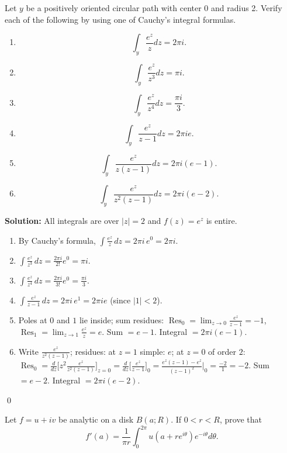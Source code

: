 \begin{problembox}
Let \( y \) be a positively oriented circular path with center 0 and radius 2. Verify each of the following by using one of Cauchy's integral formulas.
\begin{enumerate}[label=(\alph*)]
\item \[ \int_y \frac{e^z}{z} dz = 2\pi i. \]
\item \[ \int_y \frac{e^z}{z^3} dz = \pi i. \]
\item \[ \int_y \frac{e^z}{z^4} dz = \frac{\pi i}{3}. \]
\item \[ \int_y \frac{e^z}{z - 1} dz = 2\pi ie. \]
\item \[ \int_y \frac{e^z}{z(z - 1)} dz = 2\pi i(e - 1). \]
\item \[ \int_y \frac{e^z}{z^2(z - 1)} dz = 2\pi i(e - 2). \]
\end{enumerate}
\end{problembox}

\noindent\textbf{Solution:}
All integrals are over $|z|=2$ and $f(z)=e^z$ is entire.
\begin{enumerate}[label=(\alph*)]
\item By Cauchy's formula, $\int\frac{e^z}{z}\,dz=2\pi i\,e^0=2\pi i$.
\item $\int\frac{e^z}{z^3}\,dz=\frac{2\pi i}{2!}e^0=\pi i$.
\item $\int\frac{e^z}{z^4}\,dz=\frac{2\pi i}{3!}e^0=\frac{\pi i}{3}$.
\item $\int\frac{e^z}{z-1}\,dz=2\pi i\,e^1=2\pi i e$ (since $|1|<2$).
\item Poles at $0$ and $1$ lie inside; sum residues: $\operatorname{Res}_{0}=\lim_{z\to0}\frac{e^z}{z-1}=-1$, $\operatorname{Res}_{1}=\lim_{z\to1}\frac{e^z}{z}=e$. Sum $=e-1$. Integral $=2\pi i(e-1)$.
\item Write $\frac{e^z}{z^2(z-1)}$; residues: at $z=1$ simple: $e$; at $z=0$ of order $2$: $\operatorname{Res}_{0}=\frac{d}{dz}\big[z^2\frac{e^z}{z^2(z-1)}\big]_{z=0}=\frac{d}{dz}\big[\frac{e^z}{z-1}\big]_{0}=\frac{e^z(z-1)-e^z}{(z-1)^2}\Big|_{0}=\frac{-2}{1}= -2$. Sum $=e-2$. Integral $=2\pi i(e-2)$.
\end{enumerate}\qed


\begin{problembox}
Let \( f = u + iv \) be analytic on a disk \( B(a; R) \). If \( 0 < r < R \), prove that
\[f'(a) = \frac{1}{\pi r} \int_0^{2\pi} u(a + re^{i\theta}) e^{-i\theta} d\theta.\]
\end{problembox}

